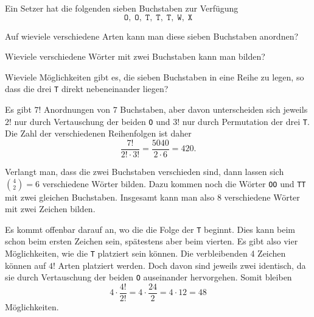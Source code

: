 Ein Setzer hat die folgenden sieben Buchstaben zur Verfügung
\[
\texttt{O},\;
\texttt{O},\;
\texttt{T},\;
\texttt{T},\;
\texttt{T},\;
\texttt{W},\;
\texttt{X}
\]
\begin{teilaufgaben}
\item Auf wieviele verschiedene Arten kann man diese sieben Buchstaben anordnen?
\item Wieviele verschiedene Wörter mit zwei Buchstaben kann man bilden?
\item Wieviele Möglichkeiten gibt es, die sieben Buchstaben in eine Reihe
zu legen, so dass die drei \texttt{T} direkt nebeneinander liegen?
\end{teilaufgaben}

\begin{loesung}
\begin{teilaufgaben}
\item
Es gibt $7!$ Anordnungen von $7$ Buchstaben, aber davon unterscheiden sich
jeweils $2!$ nur durch Vertauschung der beiden \texttt{O} und $3!$ nur
durch Permutation der drei \texttt{T}.
Die Zahl der verschiedenen Reihenfolgen ist daher
\[
\frac{7!}{2!\cdot 3!}=\frac{5040}{2\cdot 6} = 420.
\]
\item
Verlangt man, dass die zwei Buchstaben verschieden sind, dann lassen sich
$\binom{4}{2}=6$ verschiedene Wörter bilden.
Dazu kommen noch die Wörter \texttt{OO} und \texttt{TT} mit zwei gleichen
Buchstaben.
Insgesamt kann man also 8 verschiedene Wörter mit zwei Zeichen bilden.
\item
Es kommt offenbar darauf an, wo die die Folge der \texttt{T} beginnt.
Dies kann beim schon beim ersten Zeichen sein, spätestens aber beim vierten.
Es gibt also vier Möglichkeiten, wie die \texttt{T} platziert sein können.
Die verbleibenden 4 Zeichen können auf $4!$ Arten platziert werden.
Doch davon sind jeweils zwei identisch, da sie durch Vertauschung der
beiden \texttt{O} auseinander hervorgehen.
Somit bleiben 
\[
4\cdot\frac{4!}{2!}=4\cdot \frac{24}{2}=4\cdot 12=48
\]
Möglichkeiten.
\end{teilaufgaben}
\end{loesung}


